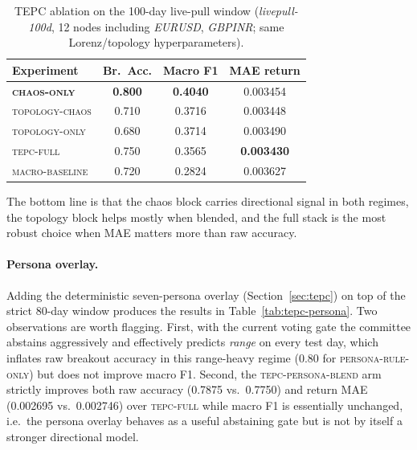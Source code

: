 \documentclass[11pt]{article}
\begin{document}
\begin{table}[H]
\centering
\small
\caption{TEPC ablation on the 100-day live-pull window (\textit{livepull-100d}, 12 nodes including \textit{EURUSD}, \textit{GBPINR}; same Lorenz/topology hyperparameters).}
\label{tab:tepc-100d}
\begin{tabular}{lccc}
\toprule
\textbf{Experiment} & \textbf{Br.\ Acc.} & \textbf{Macro F1} & \textbf{MAE return} \\
\midrule
\textbf{\textsc{chaos-only}} & \textbf{0.800} & \textbf{0.4040} & 0.003454 \\
\textsc{topology-chaos} & 0.710 & 0.3716 & 0.003448 \\
\textsc{topology-only} & 0.680 & 0.3714 & 0.003490 \\
\textsc{tepc-full} & 0.750 & 0.3565 & \textbf{0.003430} \\
\textsc{macro-baseline} & 0.720 & 0.2824 & 0.003627 \\
\bottomrule
\end{tabular}
\end{table}

The bottom line is that the chaos block carries directional signal in both regimes, the topology block helps mostly when blended, and the full stack is the most robust choice when MAE matters more than raw accuracy.

\paragraph{Persona overlay.}
Adding the deterministic seven-persona overlay (Section~\ref{sec:tepc}) on top of the strict 80-day window produces the results in Table~\ref{tab:tepc-persona}. Two observations are worth flagging. First, with the current voting gate the committee abstains aggressively and effectively predicts \emph{range} on every test day, which inflates raw breakout accuracy in this range-heavy regime (0.80 for \textsc{persona-rule-only}) but does not improve macro F1. Second, the \textsc{tepc-persona-blend} arm strictly improves both raw accuracy (0.7875 vs.\ 0.7750) and return MAE (0.002695 vs.\ 0.002746) over \textsc{tepc-full} while macro F1 is essentially unchanged, i.e.\ the persona overlay behaves as a useful abstaining gate but is not by itself a stronger directional model.
\end{document}
